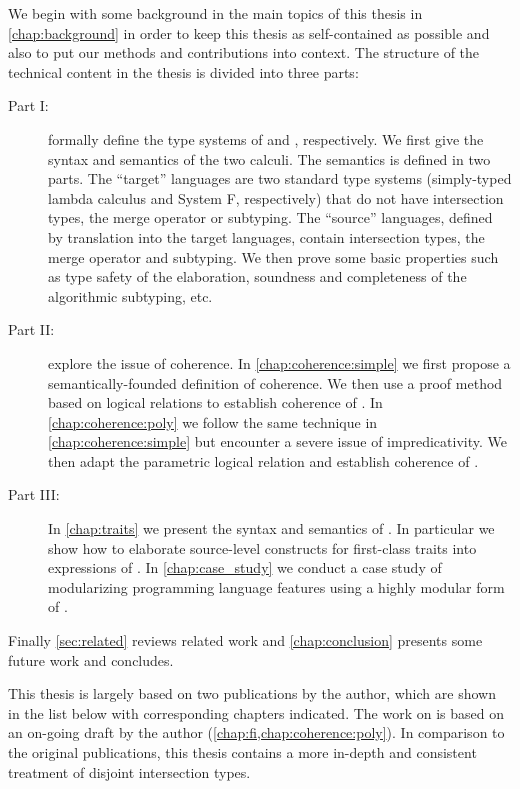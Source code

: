 We begin with some background in the main topics of this thesis in
\cref{chap:background} in order to keep this thesis as self-contained as
possible and also to put our methods and contributions into context. The
structure of the technical content in the thesis is divided into three parts:
\begin{description}
\item[Part I:]  formally define the type systems of
  \namee and \fnamee, respectively. We first give the syntax and semantics of
  the two calculi. The semantics is defined in two parts. The ``target''
  languages are two standard type systems (simply-typed lambda calculus and
  System F, respectively) that do not have intersection types, the merge
  operator or subtyping. The ``source'' languages, defined by translation into
  the target languages, contain intersection types, the merge operator and
  subtyping. We then prove some basic properties such as type safety of
  the elaboration, soundness and completeness of the algorithmic subtyping, etc.
\item[Part II:]  explore the
  issue of coherence. In \cref{chap:coherence:simple} we first propose a
  semantically-founded definition of coherence. We then use a proof method based
  on logical relations to establish coherence of \namee. In
  \cref{chap:coherence:poly} we follow the same technique in
  \cref{chap:coherence:simple} but encounter a severe issue of impredicativity. We
  then adapt the parametric logical relation and establish coherence of \fnamee.
\item[Part III:] In \cref{chap:traits} we present the syntax and semantics of
  \sedel. In particular we show how to elaborate source-level constructs for
  first-class traits into expressions of \fnamee. In \cref{chap:case_study} we
  conduct a case study of modularizing programming language features using a
  highly modular form of \visitor.
\end{description}
Finally \cref{sec:related} reviews related work and \cref{chap:conclusion}
presents some future work and concludes.

This thesis is largely based on two publications by the author, which are shown
in the list below with corresponding chapters indicated. The work on \fnamee is
based on an on-going draft by the author (\cref{chap:fi,chap:coherence:poly}).
In comparison to the original publications, this thesis contains a more in-depth
and consistent treatment of disjoint intersection types.

